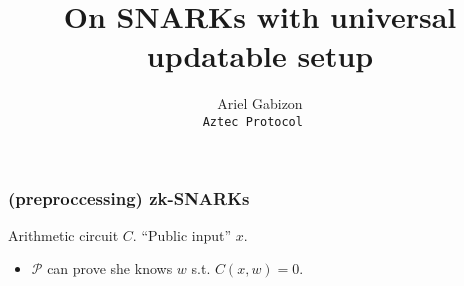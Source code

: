 \documentclass[shadesubsections,trans,14pt,mathserif]{beamer}
\title{\large{On SNARKs with universal updatable setup}}    %
\author{{Ariel Gabizon}\\                 %
\tt{\small{Aztec Protocol} } }      %
\date{}                    %
\newcommand{\prv}{\ensuremath{\mathcal{P}}}
\begin{document}
\boldmath
\begin{frame}
  \titlepage
\end{frame}






\begin{frame}
\frametitle{(preproccessing) zk-SNARKs}   %
Arithmetic circuit $C$. ``Public input'' $x$.
  \begin{itemize}
  \item $\prv$ can prove she knows $w$ s.t. $C(x,w)=0$.
  \end{itemize}
\end{frame}
\end{document}
